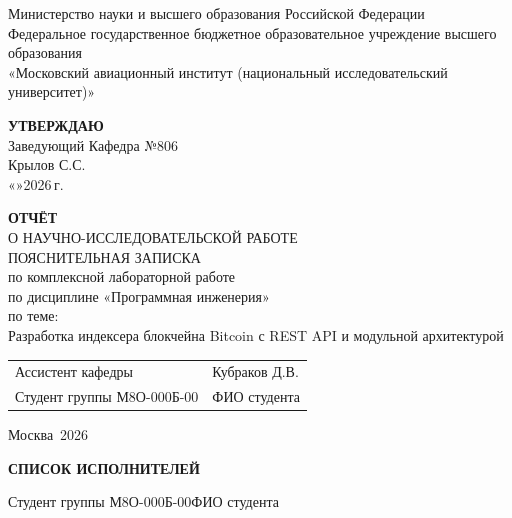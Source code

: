 ﻿\documentclass[14pt,a4paper]{extarticle}
\newcommand{\University}{Министерство науки и высшего образования Российской Федерации\\
Федеральное государственное бюджетное образовательное учреждение высшего образования\\
«Московский авиационный институт (национальный исследовательский университет)»}
\newcommand{\Department}{Кафедра №806}
\newcommand{\Supervisor}{Крылов С.С.}
\newcommand{\Advisor}{Кубраков Д.В.}
\newcommand{\Student}{ФИО студента}
\newcommand{\Group}{М8О-000Б-00}
\newcommand{\City}{Москва}
\newcommand{\Year}{2026}
\newcommand{\ReportTitle}{Разработка индексера блокчейна Bitcoin с REST API и модульной архитектурой}
\begin{document}
\begin{center}
\University
\end{center}

\vspace{1.5cm}

\begin{flushright}
\textbf{УТВЕРЖДАЮ}\\
Заведующий \Department\\
\Supervisor\\
«\hspace{1.5cm}»\hspace{2cm}\Year\,г.
\end{flushright}

\vspace{1.2cm}

\begin{center}
\textbf{ОТЧЁТ}\\
О НАУЧНО-ИССЛЕДОВАТЕЛЬСКОЙ РАБОТЕ\\
\vspace{0.4cm}
ПОЯСНИТЕЛЬНАЯ ЗАПИСКА\\
по комплексной лабораторной работе\\
по дисциплине «Программная инженерия»\\
по теме:\\
\ReportTitle
\end{center}

\vspace{1.0cm}

\begin{tabular}{p{} p{}}
Ассистент кафедры & \Advisor \\
Студент группы \Group & \Student \\
\end{tabular}

\vfill

\begin{center}
\City\, \Year
\end{center}

\newpage

\setcounter{page}{2}
\begin{center}
\textbf{СПИСОК ИСПОЛНИТЕЛЕЙ}
\end{center}

\vspace{0.8cm}

\noindent Студент группы \Group \hfill \Student
\end{document}
